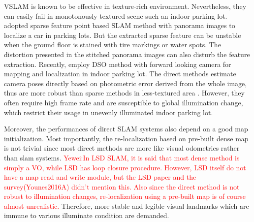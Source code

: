 \documentclass[journal]{IEEEtran}
\newcommand{\COMMENT}[1]{\textcolor{red}{#1}}
\begin{document}
%

VSLAM is known to be effective in texture-rich environment\citep{ORB}.
Nevertheless, they can easily fail in monotonously textured scene such an indoor parking lot.
\citet{VW paking} adopted sparse feature point based SLAM method with panorama images to localize a car in parking lots.
But the extracted sparse feature can be unstable when the ground floor is stained with tire markings or water spots.
The distortion presented in the stitched panorama images can also disturb the feature extraction.
Recently, \citet{Engel2017Direct} employ DSO method with forward looking camera for mapping and localization in indoor parking lot.
The direct methods estimate camera poses directly based on photometric error derived from the whole image, thus are more robust than sparse methods in less-textured area \citep{Engel2014LSD} \citep{Forster2013SVO}.
However, they often require high frame rate and are susceptible to global illumination change, which restrict their usage in unevenly illuminated indoor parking lot\citep{Younes2016A}. 

Moreover, the performances of direct SLAM systems also depend on a good map initialization.\citep{Younes2016A}\citep{Horizon DSO}
Most importantly, the re-localization based on pre-built dense map is not trivial since most direct methods are more like visual odometries rather than slam systems\citep{Engel2014LSD}.
\COMMENT{Yewei:In LSD SLAM, it is said that most dense method is simply a VO, while LSD has loop closure procedure. 
However, LSD itself do not have a map read and write module, but the LSD paper and the survey(Younes2016A) didn't mention this. Also since the direct method is not robust to illumination changes, re-localization using a pre-built map is of course almost unrealistic.}
Therefore, more stable and legible visual landmarks which are immune to various illuminate condition are demanded.
\end{document}
